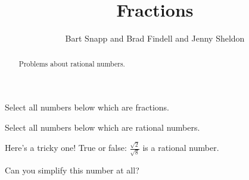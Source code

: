 \documentclass[nooutcomes]{ximera}
\title{Fractions}
\author{Bart Snapp and Brad Findell and Jenny Sheldon}
\begin{document}
\begin{abstract}
Problems about rational numbers.
\end{abstract}
\maketitle




\begin{problem}
Select all numbers below which are fractions.
\begin{selectAll}
\end{selectAll}
\end{problem}



\begin{problem}
Select all numbers below which are rational numbers.
\begin{selectAll}
\end{selectAll}
\end{problem}



\begin{problem}
Here's a tricky one!  True or false: $\frac{\sqrt{2}}{\sqrt{8}}$ is a rational number.
\begin{hint}
	Can you simplify this number at all?
\end{hint}
\begin{multipleChoice}
\end{multipleChoice}
\end{problem}
\end{document}
